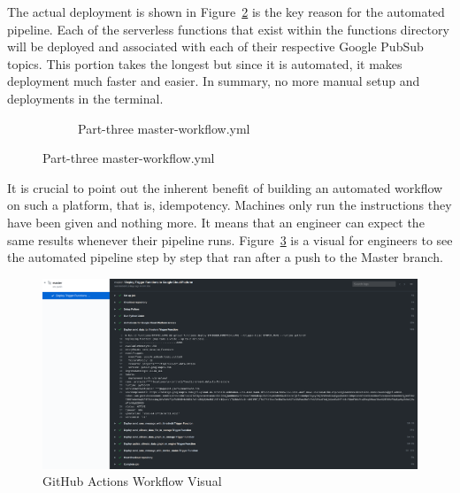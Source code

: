 \documentclass{article}
\begin{document}
The actual deployment is shown in Figure~\ref{fig:workflow-file-three} is the key reason for the automated pipeline. Each of the serverless functions that exist within the functions directory will be deployed and associated with each of their respective Google PubSub topics. This portion takes the longest but since it is automated, it makes deployment much faster and easier. In summary, no more manual setup and deployments in the terminal.

\begin{figure}[H]
    \begin{figure}[H]
        
        \caption{Part-three master-workflow.yml}
        \label{fig:workflow-file-three}
    \end{figure}
\end{figure}

It is crucial to point out the inherent benefit of building an automated workflow on such a platform, that is, idempotency. Machines only run the instructions they have been given and nothing more. It means that an engineer can expect the same results whenever their pipeline runs. Figure~\ref{fig:workflow-visual} is a visual for engineers to see the automated pipeline step by step that ran after a push to the Master branch.\\

\begin{figure}[H]
    \center
    \includegraphics[width=\textwidth]{images/github-actions.png}
    \caption{GitHub Actions Workflow Visual}
    \label{fig:workflow-visual}
\end{figure}
\end{document}

